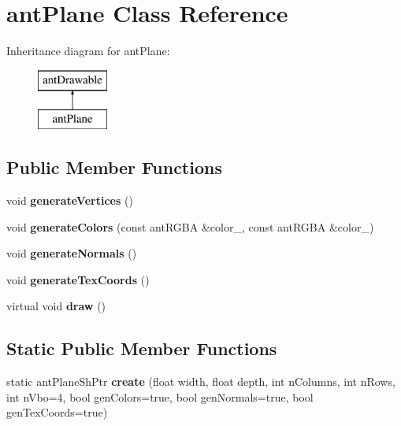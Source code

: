 \hypertarget{classant_plane}{\section{ant\+Plane Class Reference}
\label{classant_plane}
}
Inheritance diagram for ant\+Plane\+:\begin{figure}[H]
\begin{center}
\leavevmode
\includegraphics[height=2.000000cm]{classant_plane}
\end{center}
\end{figure}
\subsection*{Public Member Functions}
\begin{DoxyCompactItemize}
\item 
\hypertarget{classant_plane_ab159d806e8c8b6006c6d38532cb42957}{void {\bfseries generate\+Vertices} ()}\label{classant_plane_ab159d806e8c8b6006c6d38532cb42957}

\item 
\hypertarget{classant_plane_a0b1ff8ed4fc9bff018998ed735d70a76}{void {\bfseries generate\+Colors} (const ant\+R\+G\+B\+A \&color\+\_, const ant\+R\+G\+B\+A \&color\+\_)}\label{classant_plane_a0b1ff8ed4fc9bff018998ed735d70a76}

\item 
\hypertarget{classant_plane_a3cf33211145364ae415d7d197f835b4c}{void {\bfseries generate\+Normals} ()}\label{classant_plane_a3cf33211145364ae415d7d197f835b4c}

\item 
\hypertarget{classant_plane_a8bfac262c0c453354e6e9cfe5a3175e1}{void {\bfseries generate\+Tex\+Coords} ()}\label{classant_plane_a8bfac262c0c453354e6e9cfe5a3175e1}

\item 
\hypertarget{classant_plane_abb69c99d821189cf3a2b79d2738d7872}{virtual void {\bfseries draw} ()}\label{classant_plane_abb69c99d821189cf3a2b79d2738d7872}

\end{DoxyCompactItemize}
\subsection*{Static Public Member Functions}
\begin{DoxyCompactItemize}
\item 
\hypertarget{classant_plane_aa105beaf04d10d87a0049553eaf24619}{static ant\+Plane\+Sh\+Ptr {\bfseries create} (float width, float depth, int n\+Columns, int n\+Rows, int n\+Vbo=4, bool gen\+Colors=true, bool gen\+Normals=true, bool gen\+Tex\+Coords=true)}\label{classant_plane_aa105beaf04d10d87a0049553eaf24619}

\end{DoxyCompactItemize}

